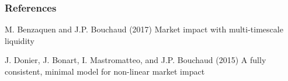 \documentclass{beamer}
\begin{document}
\begin{frame}

\frametitle{References}
\footnotesize{
\begin{thebibliography}{99} 
 M. Benzaquen and J.P. Bouchaud (2017)
\newblock Market impact with multi-timescale liquidity
\end{thebibliography}

\begin{thebibliography}{99} 
 J. Donier, J. Bonart, I. Mastromatteo, and J.P. Bouchaud (2015)
\newblock A fully consistent, minimal model for non-linear market impact
\end{thebibliography}
}

\end{frame}
\end{document}
